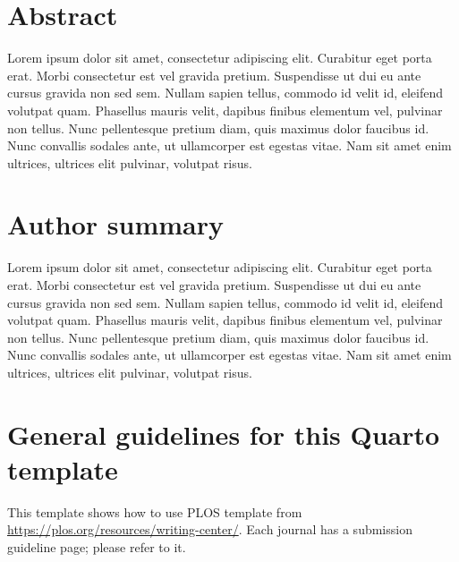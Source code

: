 \documentclass[
  10pt,
  letterpaper,
]{article}
\begin{document}
\section*{Abstract}
Lorem ipsum dolor sit amet, consectetur adipiscing elit. Curabitur eget
porta erat. Morbi consectetur est vel gravida pretium. Suspendisse ut
dui eu ante cursus gravida non sed sem. Nullam sapien tellus, commodo id
velit id, eleifend volutpat quam. Phasellus mauris velit, dapibus
finibus elementum vel, pulvinar non tellus. Nunc pellentesque pretium
diam, quis maximus dolor faucibus id. Nunc convallis sodales ante, ut
ullamcorper est egestas vitae. Nam sit amet enim ultrices, ultrices elit
pulvinar, volutpat risus.

\section*{Author summary}
Lorem ipsum dolor sit amet, consectetur adipiscing elit. Curabitur eget
porta erat. Morbi consectetur est vel gravida pretium. Suspendisse ut
dui eu ante cursus gravida non sed sem. Nullam sapien tellus, commodo id
velit id, eleifend volutpat quam. Phasellus mauris velit, dapibus
finibus elementum vel, pulvinar non tellus. Nunc pellentesque pretium
diam, quis maximus dolor faucibus id. Nunc convallis sodales ante, ut
ullamcorper est egestas vitae. Nam sit amet enim ultrices, ultrices elit
pulvinar, volutpat risus.

\linenumbers
\section{General guidelines for this Quarto
template}\label{general-guidelines-for-this-quarto-template}

This template shows how to use PLOS template from
\url{https://plos.org/resources/writing-center/}. Each journal has a
submission guideline page; please refer to it.
\end{document}
